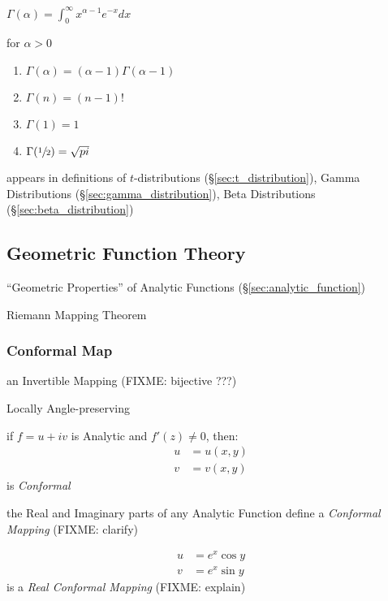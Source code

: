 $\Gamma(\alpha) = \int_0^{\infty} x^{\alpha -1} e^{-x} dx$

for $\alpha > 0$

\begin{enumerate}
\item $\Gamma(\alpha) = (\alpha - 1) \Gamma(\alpha -1)$
\item $\Gamma(n) = (n-1)!$
\item $\Gamma(1) = 1$
\item $\Gamma(\sfrac{1}{2}) = \sqrt{pi}$
\end{enumerate}

appears in definitions of $t$-distributions (\S\ref{sec:t_distribution}), Gamma
Distributions (\S\ref{sec:gamma_distribution}), Beta Distributions
(\S\ref{sec:beta_distribution})



\subsection{Geometric Function Theory}\label{sec:geometric_function_theory}

``Geometric Properties'' of Analytic Functions (\S\ref{sec:analytic_function})

Riemann Mapping Theorem



\subsubsection{Conformal Map}\label{sec:conformal_map}

an Invertible Mapping (FIXME: bijective ???)

Locally Angle-preserving

if $f = u + iv$ is Analytic and $f'(z) \neq 0$, then:
\begin{align*}
  u & = u(x,y) \\
  v & = v(x,y)
\end{align*}
is \emph{Conformal}

the Real and Imaginary parts of any Analytic Function define a \emph{Conformal
  Mapping} (FIXME: clarify)

\begin{align*}
  u & = e^x \cos y \\
  v & = e^x \sin y
\end{align*}
is a \emph{Real Conformal Mapping} (FIXME: explain)

